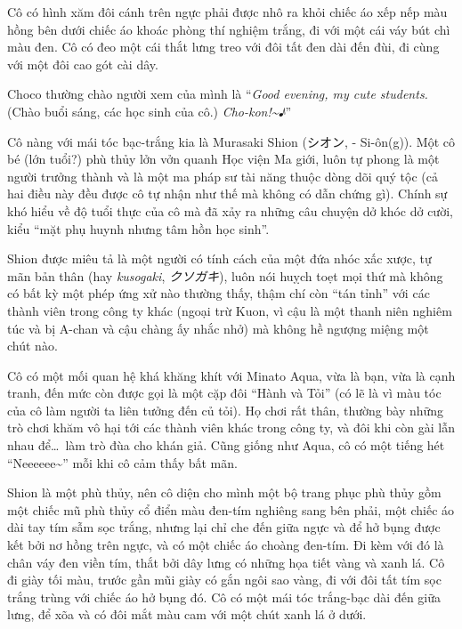 \documentclass[../main.tex]{subfiles}
\begin{document}

Cô có hình xăm đôi cánh trên ngực phải được nhô ra khỏi chiếc áo xếp nếp màu hồng bên dưới chiếc áo khoác phòng thí nghiệm trắng, đi với một cái váy bút chì màu đen. Cô có đeo một cái thắt lưng treo với đôi tất đen dài đến đùi, đi cùng với một đôi cao gót cài dây.

Choco thường chào người xem của mình là ``\textit{Good evening, my cute students.} (Chào buổi sáng, các học sinh của cô.) \textit{Cho-kon!\~{}♪}''

Cô nàng với mái tóc bạc-trắng kia là Murasaki Shion (シオン, - Si-ôn(g)). Một cô bé (lớn tuổi?) phù thủy lởn vởn quanh Học viện Ma giới, luôn tự phong là một người trưởng thành và là một ma pháp sư tài năng thuộc dòng dõi quý tộc (cả hai điều này đều được cô tự nhận như thế mà không có dẫn chứng gì). Chính sự khó hiểu về độ tuổi thực của cô mà đã xảy ra những câu chuyện dở khóc dở cười, kiểu ``mặt phụ huynh nhưng tâm hồn học sinh''.

Shion được miêu tả là một người có tính cách của một đứa nhóc xấc xược, tự mãn bản thân (hay \textit{kusogaki}, \textit{クソガキ}), luôn nói huỵch toẹt mọi thứ mà không có bất kỳ một phép ứng xử nào thường thấy, thậm chí còn ``tán tỉnh'' với các thành viên trong công ty khác (ngoại trừ Kuon, vì cậu là một thanh niên nghiêm túc và bị A-chan và cậu chàng ấy nhắc nhở) mà không hề ngượng miệng một chút nào.

Cô có một mối quan hệ khá khăng khít với Minato Aqua, vừa là bạn, vừa là cạnh tranh, đến mức còn được gọi là một cặp đôi ``Hành và Tỏi'' (có lẽ là vì màu tóc của cô làm người ta liên tưởng đến củ tỏi). Họ chơi rất thân, thường bày những trò chơi khăm vô hại tới các thành viên khác trong công ty, và đôi khi còn gài lẫn nhau để\dots\ làm trò đùa cho khán giả. Cũng giống như Aqua, cô có một tiếng hét ``Neeeeee\~{}'' mỗi khi cô cảm thấy bất mãn.

Shion là một phù thủy, nên cô diện cho mình một bộ trang phục phù thủy gồm một chiếc mũ phù thủy cổ điển màu đen-tím nghiêng sang bên phải, một chiếc áo dài tay tím sẫm sọc trắng, nhưng lại chỉ che đến giữa ngực và để hở bụng được kết bởi nơ hồng trên ngực, và có một chiếc áo choàng đen-tím. Đi kèm với đó là chân váy đen viền tím, thắt bởi dây lưng có những họa tiết vàng và xanh lá. Cô đi giày tối màu, trước gần mũi giày có gắn ngôi sao vàng, đi với đôi tất tím sọc trắng trùng với chiếc áo hở bụng đó. Cô có một mái tóc trắng-bạc dài đến giữa lưng, để xõa và có đôi mắt màu cam với một chút xanh lá ở dưới.
\end{document}
